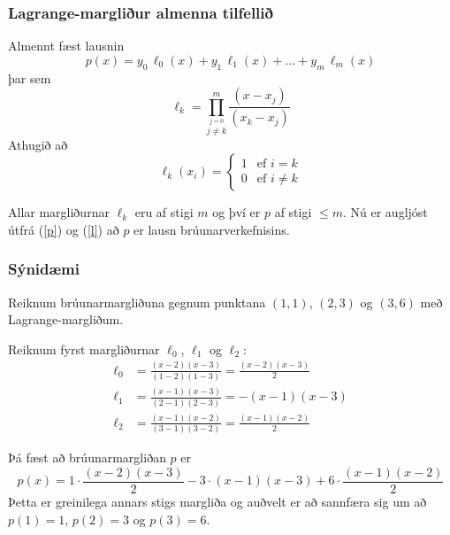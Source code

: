 \documentclass[icelandic,a4paper,12pt]{article}
\begin{document}
\subsubsection{Lagrange-margliður almenna tilfellið} 

 Almennt fæst lausnin
\begin{equation}
\label{p}
  p(x) = y_0 \, \ell_{0}(x) + y_1 \, \ell_{1}(x) 
  + \ldots + y_m \, \ell_{m}(x)
\end{equation}
þar sem
\begin{equation*}
  \ell_{k} = \prod\limits_{\stackrel{j=0}{j\not=k}}^m
  \frac{(x-x_j)}{(x_k-x_j)}
  \end{equation*}
\pause
Athugið að
\begin{equation}
\label{l}
  \ell_{k}(x_i) = \left\{ \begin{array}{cc}
      1 & \text{ef } i = k \\
      0 & \text{ef } i \not= k
  \end{array} \right.
\end{equation}

Allar margliðurnar $\ell_{k}$ eru af stigi $m$ og því er $p$ af
stigi $\leq m$. 
Nú er augljóst útfrá (\ref{p}) og (\ref{l}) að $p$ er lausn brúunarverkefnisins. 


\subsubsection{Sýnidæmi} 

Reiknum brúunarmargliðuna gegnum punktana $(1,1)$,
$(2,3)$ og $(3,6)$ með Lagrange-margliðum. 

\pause
\smallskip
Reiknum fyrst
margliðurnar $\ell_{0}$, $\ell_{1}$ og $\ell_{2}$: 
\begin{align*}
  \ell_{0} &= \frac{(x-2)(x-3)}{(1-2)(1-3)} 
  = \frac{(x-2)(x-3)}{2} \\
  \ell_{1} &= \frac{(x-1)(x-3)}{(2-1)(2-3)}
  = -(x-1)(x-3) \\
  \ell_{2} &= \frac{(x-1)(x-2)}{(3-1)(3-2)}
  = \frac{(x-1)(x-2)}{2}
\end{align*}

\pause
Þá fæst að brúunarmargliðan $p$ er
\begin{equation*}
  p(x) = 1 \cdot \frac{(x-2)(x-3)}{2}
  - 3 \cdot (x-1)(x-3)
  + 6 \cdot \frac{(x-1)(x-2)}{2}
\end{equation*}
\pause
Þetta er greinilega annars stigs margliða og auðvelt er að sannfæra
sig um að $p(1) = 1$, $p(2) = 3$ og $p(3) = 6$. 
\end{document}
